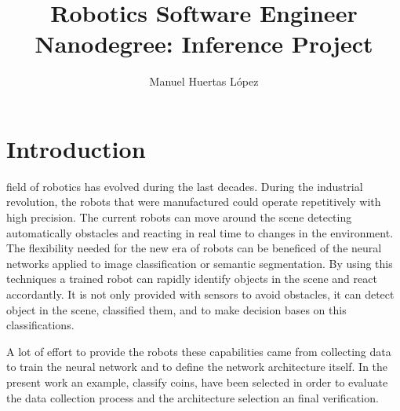 \documentclass[10pt,journal,compsoc]{IEEEtran}
\begin{document}
	
\title{Robotics Software Engineer Nanodegree: Inference Project}
\author{Manuel Huertas L\'opez}

	
	
\maketitle
\IEEEdisplaynontitleabstractindextext
\IEEEpeerreviewmaketitle
\section{Introduction}
\label{sec:introduction}
	
	
 field of robotics has evolved during the last decades. During the industrial revolution, the robots that were manufactured could operate repetitively with high precision. The current robots can move around the scene detecting automatically obstacles and reacting in real time to changes in the environment. The flexibility needed for the new era of robots can be beneficed of the neural networks applied to image classification or semantic segmentation. By using this techniques a trained robot can rapidly identify objects in the scene and react accordantly.  It is not only provided with sensors to avoid obstacles, it can detect object in the scene, classified them, and to make decision bases on this classifications.

A lot of effort to provide the robots these capabilities came from collecting data to train the neural network and to define the network architecture itself. In the present work an example, classify coins, have been selected in order to evaluate the data collection process and the architecture selection an final verification.
\end{document}
